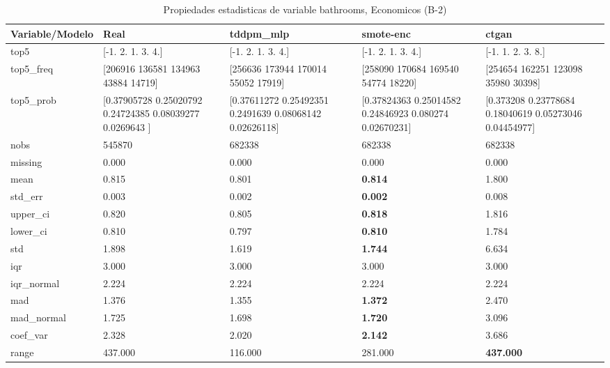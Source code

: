 \begin{table}[H]
\centering
\fontsize{8}{14}\selectfont
\caption{Propiedades  estadisticas de variable bathrooms, Economicos (B-2)}
\label{table-stats-economicos-b-2-bathrooms}
\begin{tabular}{|l|m{10em}|m{10em}|m{10em}|m{10em}|}
\hline
 \rowcolor[gray]{0.8}
Variable/Modelo & Real & tddpm\_mlp & smote-enc & ctgan \\
\hline top5 & [-1.  2.  1.  3.  4.] & [-1.  2.  1.  3.  4.] & [-1.  2.  1.  3.  4.] & [-1.  1.  2.  3.  8.] \\
\hline top5\_freq & [206916 136581 134963  43884  14719] & [256636 173944 170014  55052  17919] & [258090 170684 169540  54774  18220] & [254654 162251 123098  35980  30398] \\
\hline top5\_prob & [0.37905728 0.25020792 0.24724385 0.08039277 0.0269643 ] & [0.37611272 0.25492351 0.2491639  0.08068142 0.02626118] & [0.37824363 0.25014582 0.24846923 0.080274   0.02670231] & [0.373208   0.23778684 0.18040619 0.05273046 0.04454977] \\
\hline nobs & 545870 & 682338 & 682338 & 682338 \\
\hline missing & 0.000 & 0.000 & 0.000 & 0.000 \\
\hline mean & 0.815 & 0.801 & \bfseries 0.814 & \cellcolor[rgb]{0.9, 0.54, 0.52} 1.800 \\
\hline std\_err & 0.003 & 0.002 & \bfseries 0.002 & \cellcolor[rgb]{0.9, 0.54, 0.52} 0.008 \\
\hline upper\_ci & 0.820 & 0.805 & \bfseries 0.818 & \cellcolor[rgb]{0.9, 0.54, 0.52} 1.816 \\
\hline lower\_ci & 0.810 & 0.797 & \bfseries 0.810 & \cellcolor[rgb]{0.9, 0.54, 0.52} 1.784 \\
\hline std & 1.898 & 1.619 & \bfseries 1.744 & \cellcolor[rgb]{0.9, 0.54, 0.52} 6.634 \\
\hline iqr & 3.000 & 3.000 & 3.000 & 3.000 \\
\hline iqr\_normal & 2.224 & 2.224 & 2.224 & 2.224 \\
\hline mad & 1.376 & 1.355 & \bfseries 1.372 & \cellcolor[rgb]{0.9, 0.54, 0.52} 2.470 \\
\hline mad\_normal & 1.725 & 1.698 & \bfseries 1.720 & \cellcolor[rgb]{0.9, 0.54, 0.52} 3.096 \\
\hline coef\_var & 2.328 & 2.020 & \bfseries 2.142 & \cellcolor[rgb]{0.9, 0.54, 0.52} 3.686 \\
\hline range & 437.000 & \cellcolor[rgb]{0.9, 0.54, 0.52} 116.000 & 281.000 & \bfseries 437.000 \\

\end{tabular}
\end{table}
